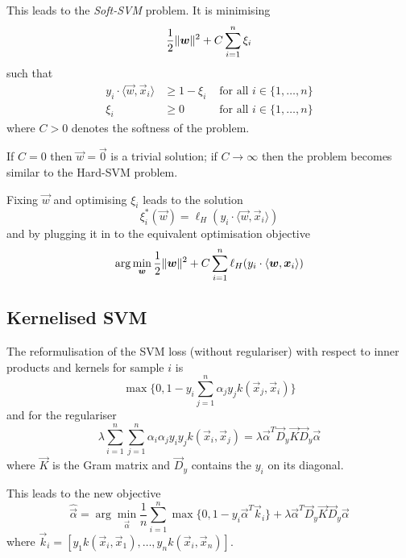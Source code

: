 This leads to the \emph{Soft-SVM} problem.
It is minimising
\begin{equation*}
\frac{1}{2} \lVert\boldsymbol{w}\rVert^2 + C \sum_{i=1}^n{\xi_i}
\end{equation*}
such that
\begin{align*}
y_i \cdot \langle \vec{w}, \vec{x}_i \rangle
&\geq 1 - \xi_i & \text{ for all $i \in \{1, \dotsc, n\}$} \\
\xi_i &\geq 0 & \text{ for all $i \in \{1, \dotsc, n\}$}
\end{align*}
where $C > 0$ denotes the softness of the problem.

If $C = 0$ then $\vec{w} = \vec{0}$ is a trivial
solution; if $C \to \infty$ then the problem
becomes similar to the Hard-SVM problem.

Fixing $\vec{w}$ and optimising $\xi_i$
leads to the solution
\begin{equation*}
\xi_i^*(\vec{w}) = \ell_H(y_i \cdot \langle \vec{w}, \vec{x}_i \rangle)
\end{equation*}
and by plugging it in to the equivalent
optimisation objective
\begin{equation*}
\arg\min_{\boldsymbol{w}}{
	\frac{1}{2} \lVert\boldsymbol{w}\rVert^2
	+ C \sum_{i=1}^n{\ell_H(y_i \cdot \langle \boldsymbol{w}, \boldsymbol{x}_i \rangle)}
}
\end{equation*}


\subsection{Kernelised SVM}
The reformulisation of the SVM loss (without regulariser)
with respect to inner products and kernels
for sample $i$ is
\begin{equation*}
\max\{0, 1 - y_i \sum_{j=1}^n{\alpha_j y_j k(\vec{x}_j, \vec{x}_i)}\}
\end{equation*}
and for the regulariser
\begin{equation*}
\lambda \sum_{i=1}^n\sum_{j=1}^n{
	\alpha_i \alpha_j y_i y_j k(\vec{x}_i, \vec{x}_j)
}
= \lambda \vec{\alpha}^T \vec{D}_y \vec{K} \vec{D}_y \vec{\alpha}
\end{equation*}
where $\vec{K}$ is the Gram matrix and
$\vec{D}_y$ contains the $y_i$ on its diagonal.

This leads to the new objective
\begin{equation*}
\hat{\vec{\alpha}} = \arg\min_{\vec{\alpha}}{
	\frac{1}{n} \sum_{i=1}^n{
		\max\{0, 1 - y_i \vec{\alpha}^T \vec{k}_i\} +
		\lambda \vec{\alpha}^T \vec{D}_y \vec{K} \vec{D}_y \vec{\alpha}
	}
}
\end{equation*}
where $\vec{k}_i = [y_1 k(\vec{x}_i, \vec{x}_1), \dotsc, y_n k(\vec{x}_i, \vec{x}_n)]$.

